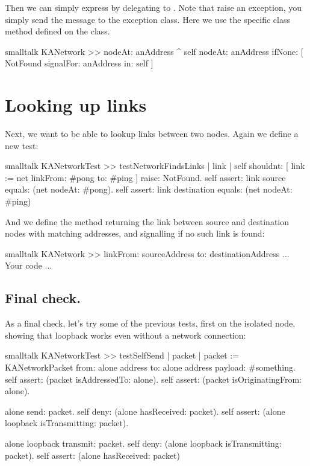 \documentclass[10pt,twoside,english]{_support/latex/sbabook/sbabook}
\begin{document}
Then we can simply express  by delegating to .
Note that raise an exception, you simply send the message  to the exception class. Here we use
the specific class method  defined on the  class.

\begin{displaycode}{smalltalk}
KANetwork >> nodeAt: anAddress
    ^ self
        nodeAt: anAddress
        ifNone: [ NotFound signalFor: anAddress in: self ]
\end{displaycode}
\section{Looking up links}
Next, we want to be able to lookup links between two nodes.
Again we define a new test:

\begin{displaycode}{smalltalk}
KANetworkTest >> testNetworkFindsLinks
    | link |
    self
        shouldnt: [ link := net linkFrom: #pong to: #ping ]
        raise: NotFound.
    self
        assert: link source
        equals: (net nodeAt: #pong).
    self
        assert: link destination
        equals: (net nodeAt: #ping)
\end{displaycode}

And we define the method  returning the link between source and destination nodes with matching addresses, and signalling  if no such link is found:

\begin{displaycode}{smalltalk}
KANetwork >> linkFrom: sourceAddress to: destinationAddress
    ... Your code ...
\end{displaycode}
\subsection{Final check. }
As a final check, let's try some of the previous tests, first on the isolated  node, showing that loopback works even without a network connection:

\begin{displaycode}{smalltalk}
KANetworkTest >> testSelfSend
    | packet |
    packet := KANetworkPacket
        from: alone address
        to: alone address
        payload: #something.
    self assert: (packet isAddressedTo: alone).
    self assert: (packet isOriginatingFrom: alone).

    alone send: packet.
    self deny: (alone hasReceived: packet).
    self assert: (alone loopback isTransmitting: packet).

    alone loopback transmit: packet.
    self deny: (alone loopback isTransmitting: packet).
    self assert: (alone hasReceived: packet)
\end{displaycode}
\end{document}
